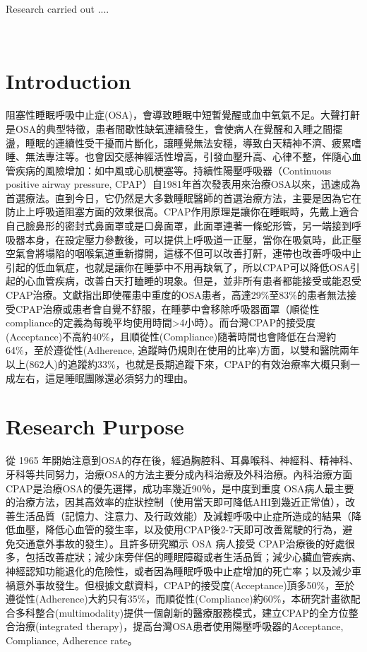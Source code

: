 \documentclass{proposalnsf}
\begin{document}
Research carried out ....

\ \\


\section{Introduction}

阻塞性睡眠呼吸中止症(OSA)，會導致睡眠中短暫覺醒或血中氧氣不足。大聲打鼾是OSA的典型特徵，患者間歇性缺氧連續發生，會使病人在覺醒和入睡之間擺盪，睡眠的連續性受干擾而片斷化，讓睡覺無法安穩，導致白天精神不濟、疲累嗜睡、無法專注等。也會因交感神經活性增高，引發血壓升高、心律不整，伴隨心血管疾病的風險增加：如中風或心肌梗塞等。持續性陽壓呼吸器（Continuous positive airway pressure, CPAP）自1981年首次發表用來治療OSA以來，迅速成為首選療法。直到今日，它仍然是大多數睡眠醫師的首選治療方法，主要是因為它在防止上呼吸道阻塞方面的效果很高。CPAP作用原理是讓你在睡眠時，先戴上適合自己臉鼻形的密封式鼻面罩或是口鼻面罩，此面罩連著一條蛇形管，另一端接到呼吸器本身，在設定壓力參數後，可以提供上呼吸道一正壓，當你在吸氣時，此正壓空氣會將塌陷的咽喉氣道重新撐開，這樣不但可以改善打鼾，連帶也改善呼吸中止引起的低血氧症，也就是讓你在睡夢中不用再缺氧了，所以CPAP可以降低OSA引起的心血管疾病，改善白天打瞌睡的現象。但是，並非所有患者都能接受或能忍受CPAP治療。文獻指出即使罹患中重度的OSA患者，高達29\%至83\%的患者無法接受CPAP治療或患者會自覺不舒服，在睡夢中會移除呼吸器面罩（順從性compliance的定義為每晚平均使用時間>4小時）。而台灣CPAP的接受度(Acceptance)不高約40\%，且順從性(Compliance)隨著時間也會降低在台灣約64\%，至於遵從性(Adherence, 追蹤時仍規則在使用的比率)方面，以雙和醫院兩年以上(862人)的追蹤約33\%，也就是長期追蹤下來，CPAP的有效治療率大概只剩一成左右，這是睡眠團隊還必須努力的理由。

\section{Research Purpose}

從 1965 年開始注意到OSA的存在後，經過胸腔科、耳鼻喉科、神經科、精神科、牙科等共同努力，治療OSA的方法主要分成內科治療及外科治療。內科治療方面CPAP是治療OSA的優先選擇，成功率幾近90％，是中度到重度 OSA病人最主要的治療方法，因其高效率的症狀控制（使用當天即可降低AHI到幾近正常值），改善生活品質（記憶力、注意力、及行政效能）及減輕呼吸中止症所造成的結果（降低血壓，降低心血管的發生率，以及使用CPAP後2-7天即可改善駕駛的行為，避免交通意外事故的發生）。且許多研究顯示 OSA 病人接受 CPAP治療後的好處很多，包括改善症狀；減少床旁伴侶的睡眠障礙或者生活品質；減少心臟血管疾病、神經認知功能退化的危險性，或者因為睡眠呼吸中止症增加的死亡率；以及減少車禍意外事故發生。但根據文獻資料，CPAP的接受度(Acceptance)頂多50\%，至於遵從性(Adherence)大約只有35\%，而順從性(Compliance)約60\%，本研究計畫欲配合多科整合(multimodality)提供一個創新的醫療服務模式，建立CPAP的全方位整合治療(integrated therapy)，提高台灣OSA患者使用陽壓呼吸器的Acceptance, Compliance, Adherence rate。
\end{document}
